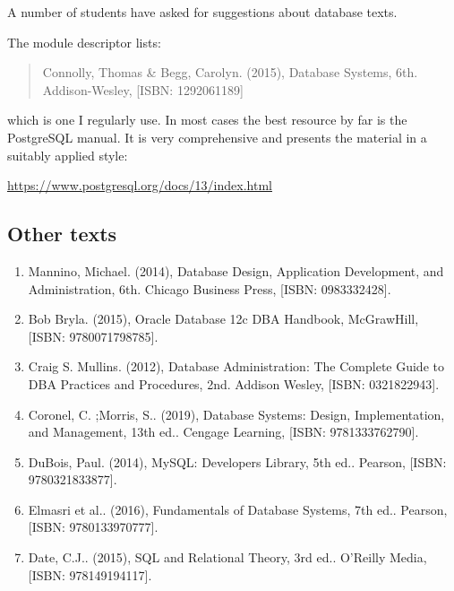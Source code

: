 \documentclass[slides]{pgnotes}
\begin{document}
A number of students have asked for suggestions about database texts.

The module descriptor lists:

\begin{quotation}
Connolly, Thomas \& Begg, Carolyn. (2015), Database Systems, 6th. Addison-Wesley, [ISBN: 1292061189]
\end{quotation}

which is one I regularly use.
In most cases the best resource by far is the PostgreSQL manual.
It is very comprehensive and presents the material in a suitably applied style:

\url{https://www.postgresql.org/docs/13/index.html}

\subsection{Other texts}

\begin{enumerate}
\item Mannino, Michael. (2014), Database Design, Application Development, and Administration, 6th. Chicago Business Press, [ISBN: 0983332428].
\item Bob Bryla. (2015), Oracle Database 12c DBA Handbook, McGrawHill, [ISBN: 9780071798785].
\item Craig S. Mullins. (2012), Database Administration: The Complete Guide to DBA Practices and Procedures, 2nd. Addison Wesley, [ISBN: 0321822943].
\item Coronel, C. ;Morris, S.. (2019), Database Systems: Design, Implementation, and Management, 13th ed.. Cengage Learning, [ISBN: 9781333762790].
\item DuBois, Paul. (2014), MySQL: Developers Library, 5th ed.. Pearson, [ISBN: 9780321833877].
\item Elmasri et al.. (2016), Fundamentals of Database Systems, 7th ed.. Pearson, [ISBN: 9780133970777].
\item Date, C.J.. (2015), SQL and Relational Theory, 3rd ed.. O'Reilly Media, [ISBN: 978149194117].
\end{enumerate}
\end{document}

